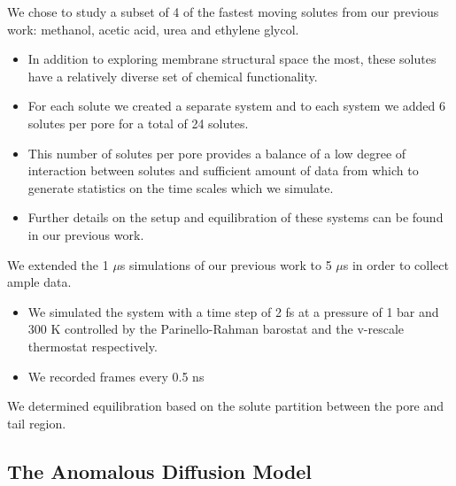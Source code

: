 \documentclass{article}
\begin{document}
  We chose to study a subset of 4 of the fastest moving solutes from our previous
  work: methanol, acetic acid, urea and ethylene glycol.
  \begin{itemize} 
    \item In addition to exploring membrane structural space the most, these solutes
    have a relatively diverse set of chemical functionality.   
    \item For each solute we created a separate system and to each system we
    added 6 solutes per pore for a total of 24 solutes.
    \item This number of solutes per pore provides a balance of a low 
    degree of interaction between solutes and sufficient amount of data from
    which to generate statistics on the time scales which we simulate.
    \item Further details on the setup and equilibration of these systems can
    be found in our previous work.\cite{coscia_chemically_2019}
  \end{itemize}
  
  \noindent We extended the 1 $\mu$s simulations of our previous work to 5 $\mu$s in order
  to collect ample data.
  \begin{itemize}
    \item We simulated the system with a time step of 2 fs at a pressure of 1 bar
    and 300 K controlled by the Parinello-Rahman barostat and the v-rescale thermostat
    respectively.
    \item We recorded frames every 0.5 ns
  \end{itemize}
  
  We determined equilibration based on the solute partition between the pore and tail
  region.

  \subsection{The Anomalous Diffusion Model}\label{method:model_sFBM}
\end{document}
